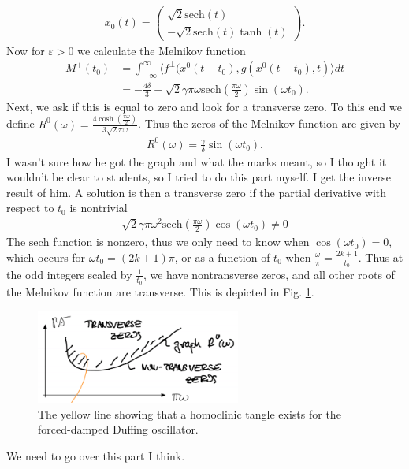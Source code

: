 \begin{ex}
\begin{align}
	x_0(t) = 
	\begin{pmatrix}
		\sqrt{2}  \textrm{sech}(t) \\  -\sqrt{2}  \textrm{sech} (t) \tanh(t)
	\end{pmatrix}
.	
\end{align}
Now for $\varepsilon>0$ we calculate the Melnikov function
\begin{align}
	M^{+}(t_0) &= \int_{-\infty }^{\infty }\langle f^{\perp}(x^{0}(t-t_0), g(x^{0}(t-t_0), t) \rangle dt \\
		   &= - \frac{4 \delta }{3} + \sqrt{2} \gamma \pi \omega  \textrm{sech} \left( \frac{\pi \omega }{2}\right)\sin(\omega t_0). 
\end{align}
Next, we ask if this is equal to zero and look for a transverse zero. To this end we define $R^{0}(\omega) = \frac{4 \cosh \left( \frac{\pi \omega }{2}\right)}{3 \sqrt{2} \pi \omega }$. Thus the zeros of the Melnikov function are given by
 \begin{align}
	 R^{0}(\omega) = \frac{\gamma }{\delta} \sin(\omega t_0).
\end{align}
{\color{blue} I wasn't sure how he got the graph and what the marks meant, so I thought it wouldn't be clear to students, so I tried to do this part myself. I get the inverse result of him}.
A solution is then a transverse zero if the partial derivative with respect to $t_0$ is nontrivial
\begin{align}
	\sqrt{2} \gamma \pi  \omega ^2  \textrm{sech} \left( \frac{\pi \omega }{2}\right) \cos(\omega t_0) \neq 0
\end{align}
The $ \textrm{sech} $ function is nonzero, thus we only need to know when $\cos(\omega t_0)=0$, which occurs for $\omega t_0 = (2k+1)\pi $, or as a function of $t_0$ when $\frac{\omega }{\pi } = \frac{2k+1}{t_0}$. Thus at the odd integers scaled by $\frac{1}{t_0}$, we have nontransverse zeros, and all other roots of the Melnikov function are transverse. This is depicted in Fig. \ref{fig:beam_tangle}.
\begin{figure}[h!]
	\centering
	\includegraphics[width=0.6\textwidth]{figures/ch6/15beam_tangle.png}
	\caption{The yellow line showing that a homoclinic tangle exists for the forced-damped Duffing oscillator.}
	\label{fig:beam_tangle}
\end{figure}
{\color{blue} We need to go over this part I think.}
\end{ex}

